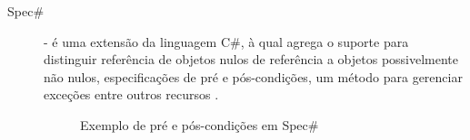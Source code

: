 \begin{description}
\vspace{8mm}

\item[Spec\#] - é uma extensão da linguagem C\#, à qual agrega o suporte para
distinguir referência de objetos nulos de referência a objetos possivelmente não
nulos, especificações de pré e pós-condições, um método para gerenciar exceções
entre outros recursos \cite{barnett2004spec}.

\vspace{6mm}

\begin{figure}[h]
\begin{small}

\vspace{-.5cm}
\end{small}
\caption{Exemplo de pré e pós-condições em Spec\#}
\label{lst:exemploJML}
\end{figure}


\end{description}





 

